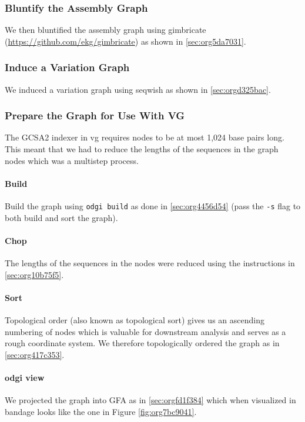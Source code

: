 \documentclass[10pt, a4paper]{article}
\begin{document}
\subsubsection{Bluntify the Assembly Graph}
\label{sec:org1bb401e}
We then bluntified the assembly graph 
using gimbricate (\url{https://github.com/ekg/gimbricate}) as shown in
\ref{sec:org5da7031}.

\subsubsection{Induce a Variation Graph}
\label{sec:orgb34870b}
We induced a variation graph using seqwish as shown in \ref{sec:orgd325bac}.

\subsubsection{Prepare the Graph for Use With VG}
\label{sec:orgb4c9a26}
The GCSA2  indexer in vg requires nodes to be at
most 1,024 base pairs long.
This meant that we had to reduce the lengths of the sequences in the graph nodes
which was a multistep process.

\paragraph{Build}
\label{sec:orgde5a96c}
Build the graph using \texttt{odgi build} as done in \ref{sec:org4456d54}
(pass the \texttt{-s} flag to both build and sort the graph).

\paragraph{Chop}
\label{sec:orgdb3e405}
The lengths of the sequences in the nodes were reduced using the instructions in
\ref{sec:org10b75f5}.

\paragraph{Sort}
\label{sec:orgb39ba20}
Topological order (also known as topological sort) gives us an ascending numbering of nodes which is 
valuable for downstream analysis and serves as a rough coordinate system.
We therefore topologically ordered the graph as in \ref{sec:org417c353}.

\paragraph{odgi view}
\label{sec:orgb51eaab}
We projected the graph into GFA as in \ref{sec:orgfd1f384} which when visualized in
bandage looks like the one in Figure \ref{fig:org7bc9041}.
\end{document}
